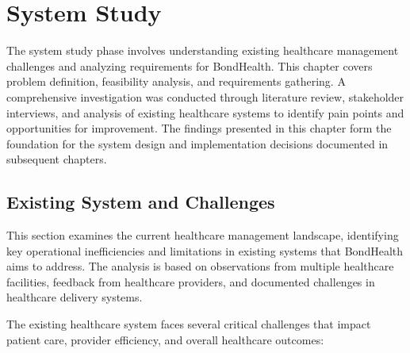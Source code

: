 \chapter{System Study}

\justifying
\noindent The system study phase involves understanding existing healthcare management challenges and analyzing requirements for BondHealth. This chapter covers problem definition, feasibility analysis, and requirements gathering. A comprehensive investigation was conducted through literature review, stakeholder interviews, and analysis of existing healthcare systems to identify pain points and opportunities for improvement. The findings presented in this chapter form the foundation for the system design and implementation decisions documented in subsequent chapters.

\section{Existing System and Challenges}

\justifying
\noindent This section examines the current healthcare management landscape, identifying key operational inefficiencies and limitations in existing systems that BondHealth aims to address. The analysis is based on observations from multiple healthcare facilities, feedback from healthcare providers, and documented challenges in healthcare delivery systems.

\justifying
\noindent The existing healthcare system faces several critical challenges that impact patient care, provider efficiency, and overall healthcare outcomes:

